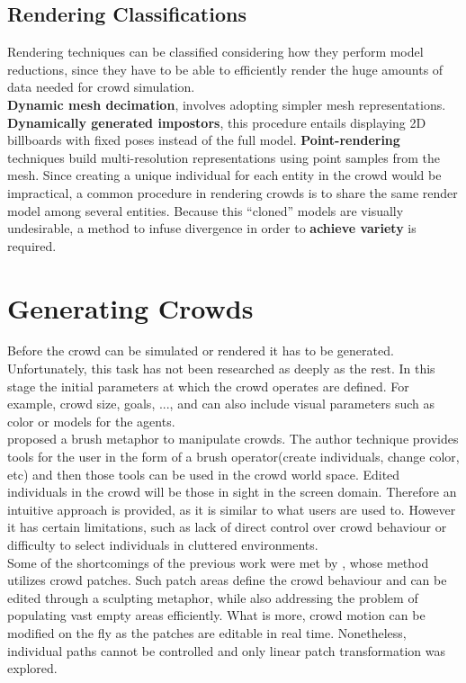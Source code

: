 \documentclass[6pt]{article} %
\begin{document}
\begin{multicols}{2}
\subsection{Rendering Classifications}
\label{subsec:RenderingClassification}

Rendering techniques can be classified considering how they perform model reductions, since they have to be able to efficiently render the huge amounts of data needed for crowd simulation.\\

\textbf{Dynamic mesh decimation}, involves adopting simpler mesh representations.
\textbf{Dynamically generated impostors}, this procedure entails displaying 2D billboards with fixed poses instead of the full model.
\textbf{Point-rendering} techniques build multi-resolution representations using point samples from the mesh.
Since creating a unique individual for each entity in the crowd would be impractical, a common procedure in rendering crowds is to share the same render model among several entities.
Because this ``cloned'' models are visually undesirable, a method to infuse divergence in order to \textbf{achieve variety} is required. 

\section{Generating Crowds}

Before the crowd can be simulated or rendered it has to be generated.
Unfortunately, this task has not been researched as deeply as the rest.
In this stage the initial parameters at which the crowd operates are defined.
For example, crowd size, goals, ..., and can also include visual parameters such as color or models for the agents.\\

\cite{Ulicny2004} proposed a brush metaphor to manipulate crowds.
The author technique provides tools for the user in the form of a brush operator(create individuals, change color, etc) and then those tools can be used in the crowd world space.
Edited individuals in the crowd will be those in sight in the screen domain.
Therefore an intuitive approach is provided, as it is similar to what users are used to.
However it has certain limitations, such as lack of direct control over crowd behaviour or difficulty to select individuals in cluttered environments.\\

Some of the shortcomings of the previous work were met by \cite{Jordao2014}, whose method utilizes crowd patches.
Such patch areas define the crowd behaviour and can be edited through a sculpting metaphor, while also addressing the problem of populating vast empty areas efficiently.
What is more, crowd motion can be modified on the fly as the patches are editable in real time.
Nonetheless, individual paths cannot be controlled and only linear patch transformation was explored.


\end{multicols}
\end{document}
